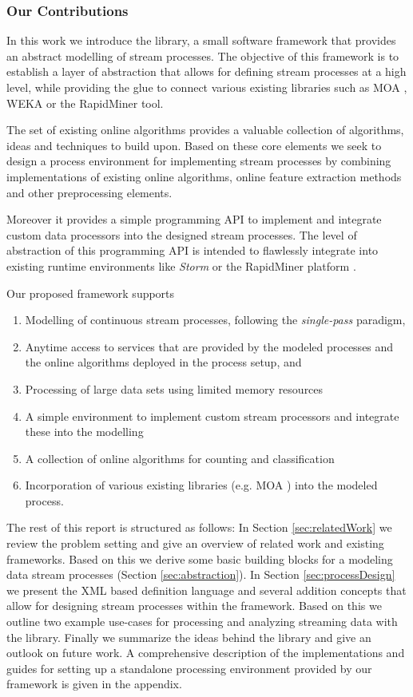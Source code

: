 \subsubsection*{Our Contributions}
In this work we introduce the \streams library, a small software
framework that provides an abstract modelling of stream processes. The
objective of this framework is to establish a layer of abstraction
that allows for defining stream processes at a high level, while
providing the glue to connect various existing libraries such as MOA
\cite{moa}, WEKA \cite{weka} or the RapidMiner tool.

The set of existing online algorithms provides a valuable collection
of algorithms, ideas and techniques to build upon. Based on these core
elements we seek to design a process environment for implementing
stream processes by combining implementations of existing online
algorithms, online feature extraction methods and other preprocessing
elements.

Moreover it provides a simple programming API to implement and
integrate custom data processors into the designed stream processes.
The level of abstraction of this programming API is intended to
flawlessly integrate into existing runtime environments like {\em
  Storm} or the RapidMiner platform \cite{rapidminer}.

Our proposed framework supports
\begin{enumerate}
\item Modelling of continuous stream processes, following the {\em
    single-pass} paradigm,
\item Anytime access to services that are provided by the modeled
  processes and the online algorithms deployed in the process setup,
  and
\item Processing of large data sets using limited memory resources
\item A simple environment to implement custom stream processors and
  integrate these into the modelling
\item A collection of online algorithms for counting and classification
\item Incorporation of various existing libraries (e.g. MOA
  \cite{moa}) into the modeled process.
\end{enumerate}

The rest of this report is structured as follows: In Section
\ref{sec:relatedWork} we review the problem setting and give an
overview of related work and existing frameworks.
Based on this we derive some basic building blocks for a modeling data
stream processes (Section \ref{sec:abstraction}). In Section
\ref{sec:processDesign} we present the XML based definition language
and several addition concepts that allow for designing stream
processes within the framework. Based on this we outline two example
use-cases for processing and analyzing streaming data with the
\streams library. Finally we summarize the ideas behind the \streams
library and give an outlook on future work. A comprehensive
description of the implementations and guides for setting up a
standalone processing environment provided by our framework is given
in the appendix.

